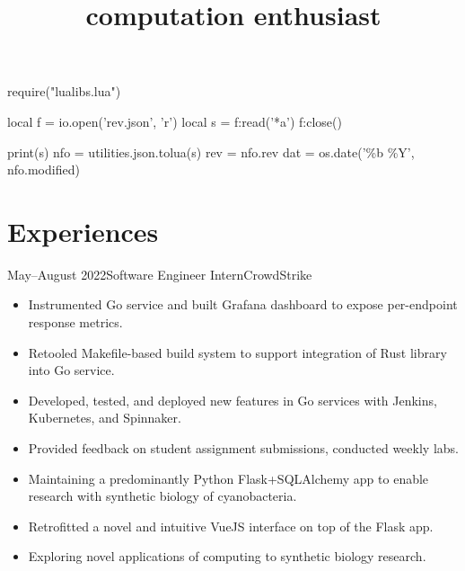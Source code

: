 \documentclass{moderncv}
\title{computation enthusiast}
\begin{document}
\begin{luacode}
require("lualibs.lua")

local f = io.open('rev.json', 'r')
local s = f:read('*a')
f:close()

print(s)
nfo = utilities.json.tolua(s)
rev = nfo.rev
dat = os.date('\%b \%Y', nfo.modified)
\end{luacode}

\newcommand{\githash}
{
  \href{https://github.com/tnytown/website/blob/\luadirect{tex.sprint(rev)}/cv.tex}
  {\texttt{\luadirect{tex.sprint(rev)}}}}
\newcommand{\lastmodified}{\luadirect{tex.sprint(dat)}}

\makecvtitle{}
\vspace*{-15mm} %

\section{Experiences}
\cventry
    {May--August 2022}{Software Engineer Intern}{CrowdStrike}{}{}
    {
      \begin{itemize}[label=\rightarrow,noitemsep]
      \item Instrumented Go service and built Grafana dashboard to expose per-endpoint response metrics.
      \item Retooled Makefile-based build system to support integration of Rust library into Go service.
      \item Developed, tested, and deployed new features in Go services with Jenkins, Kubernetes, and Spinnaker.
      \end{itemize}
    }

{
  \begin{itemize}[label=\rightarrow,noitemsep]
  \item Provided feedback on student assignment submissions, conducted weekly labs.
  \end{itemize}
}
{
  \begin{itemize}[label=\rightarrow,noitemsep]
  \item Maintaining a predominantly Python Flask+SQLAlchemy app to enable research with synthetic biology of cyanobacteria.
  \item Retrofitted a novel and intuitive VueJS interface on top of the Flask app.
  \item Exploring novel applications of computing to synthetic biology research.
  \end{itemize}
}
   
\end{document}
